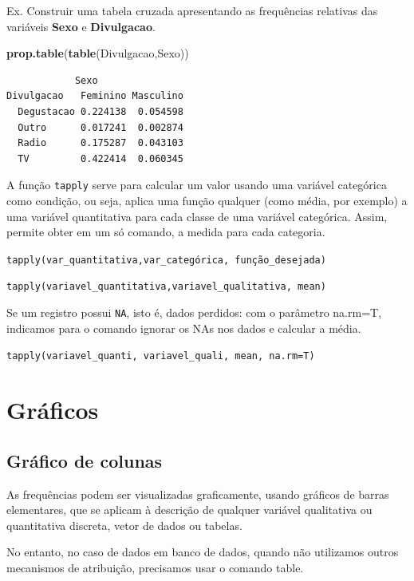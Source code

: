 \documentclass[12pt,portuguese,oneside]{book}
\newenvironment{Shaded}{\begin{snugshade}}{\end{snugshade}}
\newcommand{\KeywordTok}[1]{\textcolor[rgb]{0.13,0.29,0.53}{\textbf{#1}}}
\newcommand{\NormalTok}[1]{#1}
\begin{document}
Ex. Construir uma tabela cruzada apresentando as frequências relativas
das variáveis \textbf{Sexo} e \textbf{Divulgacao}.

\begin{Shaded}
\begin{Highlighting}[]
\KeywordTok{prop.table}\NormalTok{(}\KeywordTok{table}\NormalTok{(Divulgacao,Sexo))}
\end{Highlighting}
\end{Shaded}

\begin{verbatim}
            Sexo
Divulgacao   Feminino Masculino
  Degustacao 0.224138  0.054598
  Outro      0.017241  0.002874
  Radio      0.175287  0.043103
  TV         0.422414  0.060345
\end{verbatim}

A função \texttt{tapply} serve para calcular um valor usando uma
variável categórica como condição, ou seja, aplica uma função qualquer
(como média, por exemplo) a uma variável quantitativa para cada classe
de uma variável categórica. Assim, permite obter em um só comando, a
medida para cada categoria.

\texttt{tapply(var\_quantitativa,var\_categórica,\ função\_desejada)}

\texttt{tapply(variavel\_quantitativa,variavel\_qualitativa,\ mean)}

Se um registro possui \texttt{NA}, isto é, dados perdidos: com o
parâmetro na.rm=T, indicamos para o comando ignorar os NAs nos dados e
calcular a média.

\texttt{tapply(variavel\_quanti,\ variavel\_quali,\ mean,\ na.rm=T)}

\section{Gráficos}\label{graficos}

\subsection{Gráfico de colunas}\label{grafico-de-colunas}

As frequências podem ser visualizadas graficamente, usando gráficos de
barras elementares, que se aplicam à descrição de qualquer variável
qualitativa ou quantitativa discreta, vetor de dados ou tabelas.

No entanto, no caso de dados em banco de dados, quando não utilizamos
outros mecanismos de atribuição, precisamos usar o comando table.
\end{document}
